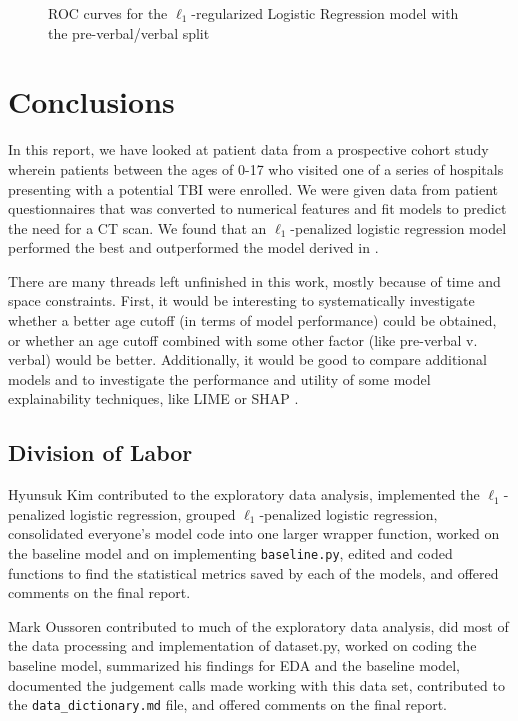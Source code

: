 \documentclass[11pt, letterpaper]{amsart}
\let\Oldsection\section
\renewcommand{\section}{\FloatBarrier\Oldsection}
\let\Oldsubsection\subsection
\renewcommand{\subsection}{\FloatBarrier\Oldsubsection}
\begin{document}
\begin{figure}
\begin{minipage}[b]{0.5\linewidth}
		\label{fig:lr_test_roc_vb}
	\end{minipage}
	\caption{ROC curves for the $\ell_1$-regularized Logistic Regression model with the pre-verbal/verbal split}\label{fig:lr_roc_vb}
\end{figure}

\section{Conclusions} \label{sec:conclusions}

In this report, we have looked at patient data from a prospective cohort study wherein patients between the ages of 0-17 who visited one of a series of hospitals presenting with a potential TBI were enrolled. We were given data from patient questionnaires that was converted to numerical features and fit models to predict the need for a CT scan. We found that an $\ell_1$-penalized logistic regression model performed the best and outperformed the model derived in  \cite{kuppermann2009identification}. 

There are many threads left unfinished in this work, mostly because of time and space constraints. First, it would be interesting to systematically investigate whether a better age cutoff (in terms of model performance) could be obtained, or whether an age cutoff combined with some other factor (like pre-verbal v. verbal) would be better. Additionally, it would be good to compare additional models and to investigate the performance and utility of some model explainability techniques, like LIME \cite{ribeiro2016should} or SHAP \cite{vstrumbelj2014explaining}. 


\subsection{Division of Labor}

Hyunsuk Kim contributed to the exploratory data analysis, implemented the $\ell_1$-penalized logistic regression, grouped $\ell_1$-penalized logistic regression, consolidated everyone's model code into one larger wrapper function, worked on the baseline model and on implementing \texttt{baseline.py}, edited and coded functions to find the statistical metrics saved by each of the models, and offered comments on the final report.

Mark Oussoren contributed to much of the exploratory data analysis, did most of the data processing and implementation of dataset.py, worked on coding the baseline model, summarized his findings for EDA and the baseline model, documented the judgement calls made working with this data set, contributed to the \texttt{data\_dictionary.md} file, and offered comments on the final report.
\end{document}
